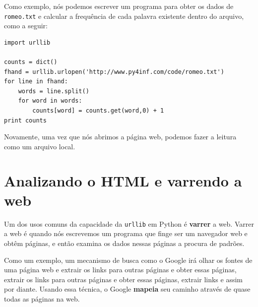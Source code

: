 Como exemplo, nós podemos escrever um programa para obter os dados de
{\tt romeo.txt} e calcular a frequência de cada palavra existente dentro do
arquivo, como a seguir:

\beforeverb
\begin{verbatim}
import urllib

counts = dict()
fhand = urllib.urlopen('http://www.py4inf.com/code/romeo.txt')
for line in fhand:
    words = line.split()
    for word in words:
        counts[word] = counts.get(word,0) + 1   
print counts
\end{verbatim}
\afterverb

Novamente, uma vez que nós abrimos a página web, podemos fazer a leitura como
um arquivo local.

\section{Analizando o HTML e varrendo a web}

Um dos usos comuns da capacidade da {\tt urllib} em Python é 
{\bf varrer} a web. Varrer a web é quando nós escrevemos um programa
que finge ser um navegador web e obtêm páginas, e então examina os dados
nessas páginas a procura de padrões.

Como um exemplo, um mecanismo de busca como o Google irá olhar os fontes de
uma página web e extrair os links para outras páginas e obter essas páginas,
extrair os links para outras páginas e obter essas páginas, extrair links e
assim por diante. Usando essa técnica, o Google {\bf mapeia} seu caminho
através de quase todas as páginas na web.   

